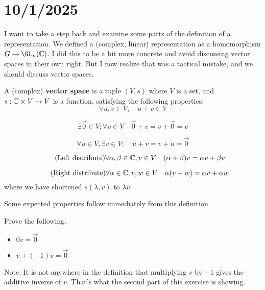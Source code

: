 \section*{10/1/2025}


I want to take a step back and examine some parts of the definition of a representation.
We defined a (complex, linear) representation as a homomorphism $G\to \GL_n(\C)$.
I did this to be a bit more concrete and avoid discussing vector spaces in their own right.
But I now realize that was a tactical mistake, and we should discuss vector spaces.

\begin{definition}
    A (complex) {\bf vector space} is a tuple $(V, s)$ where $V$ is a set, 
    and $s:\mathbb{C} \times V \to V$ is a function,
    satisfying the following properties:
    \begin{equation*}\tag{Addition}
        \forall u,v\in V, \quad u+v\in V
    \end{equation*}

    \begin{equation*}\tag{Zero}
        \exists \vec{0}\in V; \forall v\in V \quad \vec{0}+v = v+\vec{0} = v
    \end{equation*}

    \begin{equation*}\tag{Negative}
        \forall u\in V, \exists v\in V; \quad u+v = v+u = \vec{0}
    \end{equation*}

    \begin{equation*}\tag{Left distribute}
        \forall \alpha,\beta\in \mathbb{C}, v\in V \quad (\alpha+\beta)v = \alpha v + \beta v 
    \end{equation*}

    \begin{equation*}\tag{Right distribute}
        \forall \alpha\in \mathbb{C}, v,w\in V \quad \alpha(v+w) = \alpha v + \alpha w
    \end{equation*}
    where we have shortened $s(\lambda,v)$ to $\lambda v$.
\end{definition}

Some expected properties follow immediately from this definition.

\begin{exercise}
    Prove the following.
    \begin{itemize}
        \item $0 v=\vec{0}$
        \item $v + (-1)v = \vec{0}$
    \end{itemize}
    Note: It is not anywhere in the definition that multiplying $v$ by $-1$ gives the additive inverse of $v$.
    That's what the second part of this exercise is showing.
\end{exercise}

